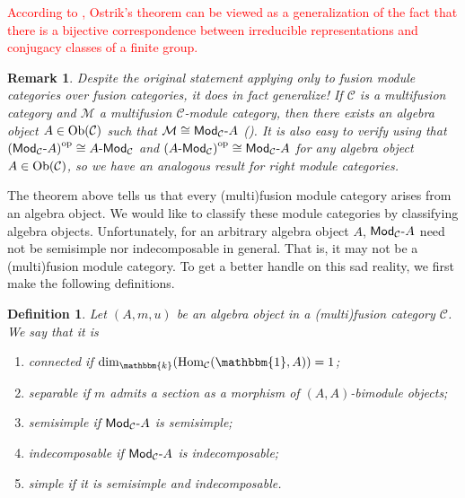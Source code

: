 \documentclass[12pt, reqno]{amsart}
\numberwithin{equation}{section}
\theoremstyle{plainspace}
\theoremstyle{definitionspace}
\newtheorem{definition}[theorem]{Definition}
\theoremstyle{remarkspace}
\newtheorem{remark}[theorem]{Remark}
\newcommand{\mathcat}[1]{\mathcal{#1}}
\newcommand{\Ob}{\textup{Ob}}
\newcommand{\Hom}[2][]{
	\ifthenelse{\equal{#2}{}}
		{\textup{Hom}_{#1}}
		{\textup{Hom}_{#1}\!\left(#2\right)}
}
\newcommand{\opcat}[1]{{#1}^{\textup{op}}}
\newcommand{\textcat}[1]{\textup{\textsf{#1}}}
\newcommand{\rmodcat}[2][]{\textcat{Mod}_{#1}\textcat{-}#2}
\newcommand{\lmodcat}[2][]{#2\textcat{-Mod}_{#1}}
\begin{document}
\noindent \textcolor{red}{According to \cite{Mackaay_2019}, Ostrik's theorem can be viewed as a generalization of the fact that there is a bijective correspondence between irreducible representations and conjugacy classes of a finite group.}
\newline

\begin{remark}\label{rem:modules_from_algebras}
Despite the original statement applying only to fusion module categories over fusion categories, it does in fact generalize! If $\mathcat{C}$ is a multifusion category and $\mathcat{M}$ a multifusion $\mathcat{C}$-module category, then there exists an algebra object $A \in \Ob(\mathcat{C})$ such that $\mathcat{M} \cong \rmodcat[\mathcat{C}]{A}$ (\cite[Corollary 7.10.5]{Etingof_2016}). It is also easy to verify using \cite[Proposition 7.1.6]{Etingof_2016} that $\opcat{(\rmodcat[\mathcat{C}]{A})} \cong \lmodcat[\mathcat{C}]{A}$ and $\opcat{(\lmodcat[\mathcat{C}]{A})} \cong \rmodcat[\mathcat{C}]{A}$ for any algebra object $A \in \Ob(\mathcat{C})$, so we have an analogous result for right module categories.
\end{remark}
\leavevmode

\noindent The theorem above tells us that every (multi)fusion module category arises from an algebra object. We would like to classify these module categories by classifying algebra objects. Unfortunately, for an arbitrary algebra object $A$, $\rmodcat[\mathcat{C}]{A}$ need not be semisimple nor indecomposable in general. That is, it may not be a (multi)fusion module category. To get a better handle on this sad reality, we first make the following definitions.
\newline

\begin{definition}\label{def:algebra_object_notation}
Let $(A, m, u)$ be an algebra object in a (multi)fusion category $\mathcat{C}$. We say that it is
\begin{enumerate}[start=1, leftmargin=1.5cm, label={(\arabic*).}]
\item {\em connected} if $\dim_{\mathbbm{k}}(\Hom[\mathcat{C}]{\mathbbm{1}, A}) = 1$;
\item {\em separable} if $m$ admits a section as a morphism of $(A, A)$-bimodule objects;
\item {\em semisimple} if $\rmodcat[\mathcat{C}]{A}$ is semisimple;
\item {\em indecomposable} if $\rmodcat[\mathcat{C}]{A}$ is indecomposable;
\item {\em simple} if it is semisimple and indecomposable.
\end{enumerate}
\end{definition}
\leavevmode
\end{document}
